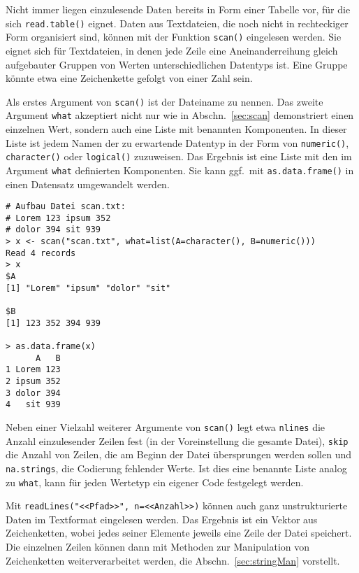 Nicht immer liegen einzulesende Daten bereits in Form einer Tabelle vor, für die sich \lstinline!read.table()! eignet. Daten aus Textdateien, die noch nicht in rechteckiger Form organisiert sind, können mit der Funktion \lstinline!scan()! eingelesen werden. Sie eignet sich für Textdateien, in denen jede Zeile eine Aneinanderreihung gleich aufgebauter Gruppen von Werten unterschiedlichen Datentyps ist. Eine Gruppe könnte etwa eine Zeichenkette gefolgt von einer Zahl sein.

Als erstes Argument von \lstinline!scan()! ist der Dateiname zu nennen. Das zweite Argument \lstinline!what! akzeptiert nicht nur wie in Abschn.\ \ref{sec:scan} demonstriert einen einzelnen Wert, sondern auch eine Liste mit benannten Komponenten. In dieser Liste ist jedem Namen der zu erwartende Datentyp in der Form von \lstinline!numeric()!, \lstinline!character()! oder \lstinline!logical()! zuzuweisen. Das Ergebnis ist eine Liste mit den im Argument \lstinline!what! definierten Komponenten. Sie kann ggf.\ mit \lstinline!as.data.frame()! in einen Datensatz umgewandelt werden.
\begin{lstlisting}
# Aufbau Datei scan.txt:
# Lorem 123 ipsum 352
# dolor 394 sit 939
> x <- scan("scan.txt", what=list(A=character(), B=numeric()))
Read 4 records
> x
$A
[1] "Lorem" "ipsum" "dolor" "sit"  

$B
[1] 123 352 394 939

> as.data.frame(x)
      A   B
1 Lorem 123
2 ipsum 352
3 dolor 394
4   sit 939
\end{lstlisting}

Neben einer Vielzahl weiterer Argumente von \lstinline!scan()! legt etwa \lstinline!nlines! die Anzahl einzulesender Zeilen fest (in der Voreinstellung die gesamte Datei), \lstinline!skip! die Anzahl von Zeilen, die am Beginn der Datei übersprungen werden sollen und \lstinline!na.strings!, die Codierung fehlender Werte. Ist dies eine benannte Liste analog zu \lstinline!what!, kann für jeden Wertetyp ein eigener Code festgelegt werden.

Mit \lstinline!readLines("<<Pfad>>", n=<<Anzahl>>)! können auch ganz unstrukturierte Daten im Textformat eingelesen werden. Das Ergebnis ist ein Vektor aus Zeichenketten, wobei jedes seiner Elemente jeweils eine Zeile der Datei speichert. Die einzelnen Zeilen können dann mit Methoden zur Manipulation von Zeichenketten weiterverarbeitet werden, die Abschn.\ \ref{sec:stringMan} vorstellt.

